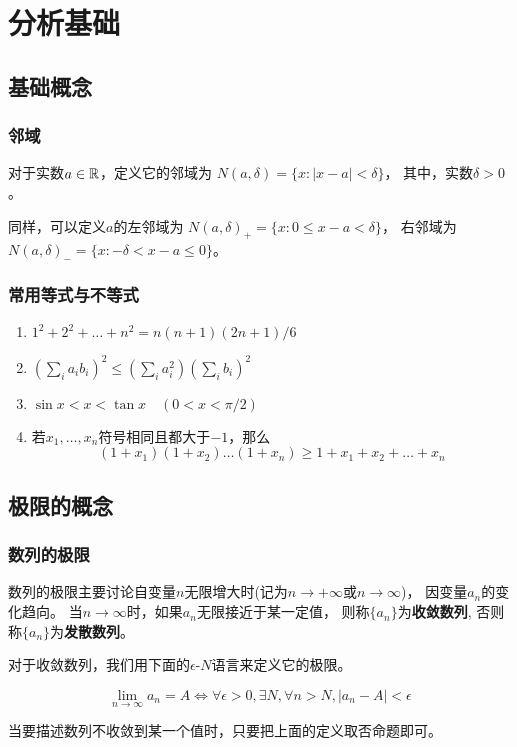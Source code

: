 \chapter{分析基础}

\section{基础概念}
\subsection{邻域}
对于实数$a\in\mathbb{R}$，定义它的邻域为
$N(a,\delta) = \{ x: |x-a| < \delta \}$，
其中，实数$\delta > 0$。

同样，可以定义$a$的左邻域为
$N(a,\delta)_+ = \{ x: 0 \le x - a < \delta \}$，
右邻域为
$N(a,\delta)_- = \{ x: -\delta < x - a \le 0  \}$。

\subsection{常用等式与不等式}
\begin{enumerate}
  \item
  $1^2+2^2+\dots +n^2 = n(n+1)(2n+1)/6$
  \item
  $(\sum_{i}a_i b_i)^2 \le (\sum_{i}a_i^2)(\sum_{i}b_i)^2$
  \item
  $\sin x < x < \tan x \quad (0 < x < \pi/2)$
  \item
  若$x_1,\dots,x_n$符号相同且都大于$-1$，那么
  \[(1+x_1)(1+x_2)\dots(1+x_n)\ge 1+x_1+x_2+\dots+x_n\]
\end{enumerate}

\section{极限的概念}
\subsection{数列的极限}
数列的极限主要讨论自变量$n$无限增大时(记为$n\to+\infty$或$n\to\infty$)，
因变量$a_n$的变化趋向。
当$n\to\infty$时，如果$a_n$无限接近于某一定值，
则称$\{a_n\}$为\textbf{收敛数列},
否则称$\{a_n\}$为\textbf{发散数列}。

对于收敛数列，我们用下面的$\epsilon$-$N$语言来定义它的极限。
\begin{definition}
  \begin{displaymath}
    \lim_{n\to\infty}a_n=A
    \iff \forall\epsilon>0,\exists N,\forall n>N,|a_n - A|<\epsilon
  \end{displaymath}
\end{definition}
\begin{remark}
  当要描述数列不收敛到某一个值时，只要把上面的定义取否命题即可。
\end{remark}

